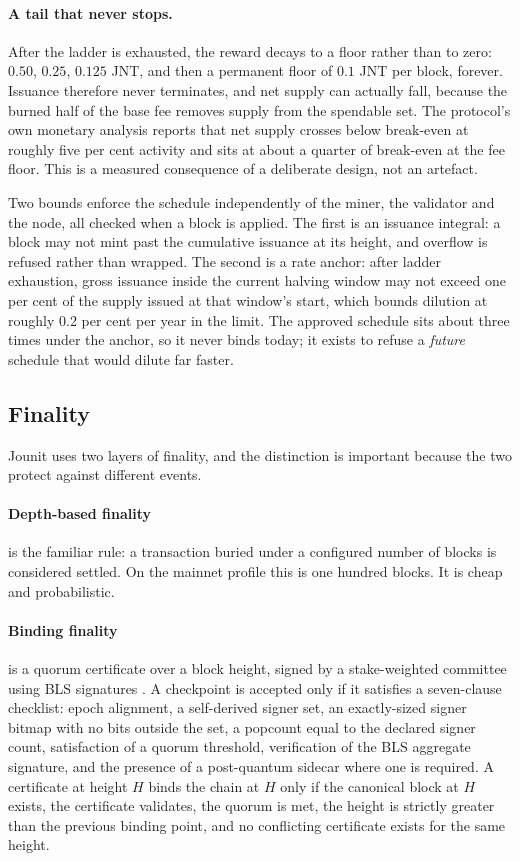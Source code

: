 \documentclass{article}
\begin{document}
\paragraph{A tail that never stops.} After the ladder is exhausted, the reward
decays to a floor rather than to zero: $0.50$, $0.25$, $0.125$ JNT, and then
a permanent floor of $0.1$ JNT per block, forever. Issuance therefore never
terminates, and net supply can actually fall, because the burned half of the
base fee removes supply from the spendable set. The protocol's own monetary
analysis reports that net supply crosses below break-even at roughly five per
cent activity and sits at about a quarter of break-even at the fee floor. This
is a measured consequence of a deliberate design, not an artefact.

Two bounds enforce the schedule independently of the miner, the validator and
the node, all checked when a block is applied. The first is an issuance
integral: a block may not mint past the cumulative issuance at its height, and
overflow is refused rather than wrapped. The second is a rate anchor: after
ladder exhaustion, gross issuance inside the current halving window may not
exceed one per cent of the supply issued at that window's start, which bounds
dilution at roughly 0.2 per cent per year in the limit. The approved schedule
sits about three times under the anchor, so it never binds today; it exists to
refuse a \emph{future} schedule that would dilute far faster.

\subsection{Finality}
\label{sec:finality}

Jounit uses two layers of finality, and the distinction is important because
the two protect against different events.

\paragraph{Depth-based finality} is the familiar rule: a transaction buried
under a configured number of blocks is considered settled. On the mainnet
profile this is one hundred blocks. It is cheap and probabilistic.

\paragraph{Binding finality} is a quorum certificate over a block height,
signed by a stake-weighted committee using BLS signatures
\cite{boneh2003aggregate,bls-signature2022}. A checkpoint is accepted only if
it satisfies a seven-clause checklist: epoch alignment, a self-derived signer
set, an exactly-sized signer bitmap with no bits outside the set, a popcount
equal to the declared signer count, satisfaction of a quorum threshold,
verification of the BLS aggregate signature, and the presence of a
post-quantum sidecar where one is required. A certificate at height $H$ binds
the chain at $H$ only if the canonical block at $H$ exists, the certificate
validates, the quorum is met, the height is strictly greater than the previous
binding point, and no conflicting certificate exists for the same height.
\end{document}
